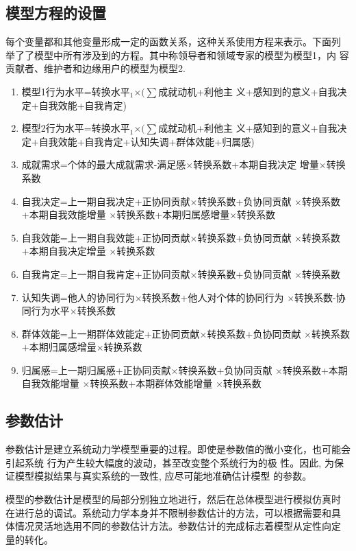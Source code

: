 \subsection{模型方程的设置}

每个变量都和其他变量形成一定的函数关系，这种关系使用方程来表示。下面列
举了了模型中所有涉及到的方程。其中称领导者和领域专家的模型为模型1，内
容贡献者、维护者和边缘用户的模型为模型2.
\begin{enumerate}
\item 模型1行为水平=转换水平$_1$$\times (\sum$成就动机+利他主
  义+感知到的意义+自我决定+自我效能+自我肯定)
\item 模型2行为水平=转换水平$_1$$\times (\sum$成就动机+利他主
  义+感知到的意义+自我决定+自我效能+自我肯定+认知失调+群体效能+归属感)
  
\item 成就需求=个体的最大成就需求-满足感$\times$转换系数+本期自我决定
  增量$\times$转换系数
\item 自我决定=上一期自我决定+正协同贡献$\times$转换系数+负协同贡献
  $\times$转换系数+本期自我效能增量 $\times$转换系数+本期归属感增量$\times$转换系数
\item  自我效能=上一期自我效能+正协同贡献$\times$转换系数+负协同贡献
  $\times$转换系数+本期自我决定增量 $\times$转换系数
\item 自我肯定=上一期自我肯定+正协同贡献$\times$转换系数+负协同贡献
  $\times$转换系数
\item 认知失调=他人的协同行为$\times$转换系数+他人对个体的协同行为
  $\times$转换系数-协同行为水平$\times$转换系数
\item 群体效能=上一期群体效能定+正协同贡献$\times$转换系数+负协同贡献
  $\times$转换系数+本期归属感增量$\times$转换系数
\item 归属感=上一期归属感+正协同贡献$\times$转换系数+负协同贡献
  $\times$转换系数+本期自我效能增量 $\times$转换系数+本期群体效能增量 $\times$转换系数



\end{enumerate}

\subsection{参数估计}
参数估计是建立系统动力学模型重要的过程。即使是参数值的微小变化，也可能会引起系统
行为产生较大幅度的波动，甚至改变整个系统行为的极
性。因此, 为保证模型模拟结果与真实系统的一致性, 应尽可能地准确估计模型
的参数。

模型的参数估计是模型的局部分别独立地进行，然后在总体模型进行模拟仿真时
在进行总的调试。系统动力学本身并不限制参数估计的方法，可以根据需要和具
体情况灵活地选用不同的参数估计方法。参数估计的完成标志着模型从定性向定
量的转化。

